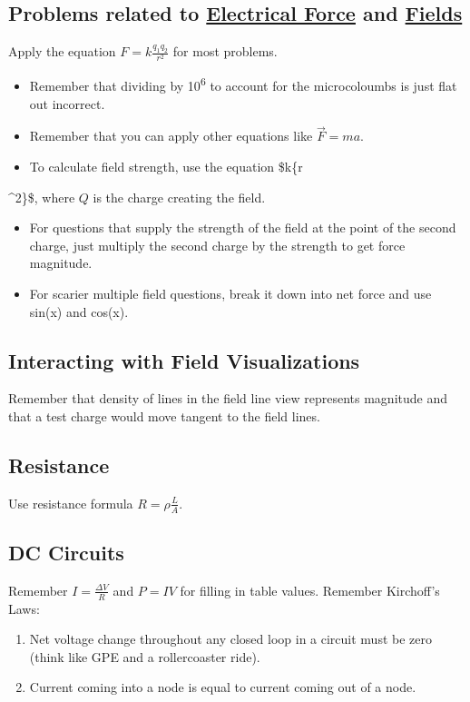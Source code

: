 \documentclass[letterpaper]{article}
\begin{document}
\subsection{Problems related to \href{phys250-electricalforce.org}{Electrical Force} and \href{phys250-fields.org}{Fields}}
\label{sec:org53b0fcc}
Apply the equation \(F = k\frac{q_1q_2}{r^2}\) for most problems.

\begin{itemize}
\item Remember that dividing by 10\textsuperscript{6} to account for the microcoloumbs is just flat out incorrect.
\item Remember that you can apply other equations like \(\vec{F}=ma\).
\item To calculate field strength, use the equation \$k\{r
\end{itemize}
\^{}2\}\$, where \(Q\) is the charge creating the field.
\begin{itemize}
\item For questions that supply the strength of the field at the point of the second charge, just multiply the second charge by the strength to get force magnitude.
\item For scarier multiple field questions, break it down into net force and use sin(x) and cos(x).
\end{itemize}

\subsection{Interacting with Field Visualizations}
\label{sec:org5aac84d}
Remember that density of lines in the field line view represents magnitude and that a test charge would move tangent to the field lines.

\subsection{Resistance}
\label{sec:org357db00}
Use resistance formula \(R = \rho\frac{L}{A}\).

\subsection{DC Circuits}
\label{sec:org13eebec}
Remember \(I = \frac{\Delta V}{R}\) and \(P = IV\) for filling in table values.
Remember Kirchoff's Laws:
\begin{enumerate}
\item Net voltage change throughout any closed loop in a circuit must be zero (think like GPE and a rollercoaster ride).
\item Current coming into a node is equal to current coming out of a node.
\end{enumerate}
\end{document}
